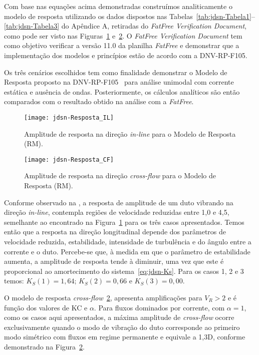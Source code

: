 Com base nas equações acima demonstradas construímos analiticamente o modelo de resposta utilizando os dados dispostos nas Tabelas~\ref{tab:jdsn-Tabela1}--\ref{tab:jdsn-Tabela3} do Apêndice A, retiradas do \textit{FatFree Verification Document}, como pode ser visto nas Figuras~\ref{fig:jdsn-Resposta_IL} e~\ref{fig:jdsn-Resposta_CF}. O \textit{FatFree Verification Document} tem como objetivo verificar a versão 11.0 da planilha \textit{FatFree} e demonstrar que a implementação dos modelos e princípios estão de acordo com a DNV-RP-F105.

Os três cenários escolhidos tem como finalidade demonstrar o Modelo de Resposta proposto na DNV-RP-F105~\cite{DNV2006} para análise unimodal com corrente estática e ausência de ondas. Posteriormente, os cálculos analíticos são então comparados com o resultado obtido na análise com a \textit{FatFree}.


\begin{figure}[H]
\begin{center}
\texttt{[image: jdsn-Resposta\_IL]}
\caption{Amplitude de resposta na direção \textit{in-line} para o Modelo de Resposta (RM).}
\label{fig:jdsn-Resposta_IL}
\end{center}
\end{figure}

\begin{figure}[H]
\begin{center}
\texttt{[image: jdsn-Resposta\_CF]}
\caption{Amplitude de resposta na direção \textit{cross-flow} para o Modelo de Resposta (RM).}
\label{fig:jdsn-Resposta_CF}
\end{center}
\end{figure}

Conforme observado na , a resposta de amplitude de um duto vibrando na direção \textit{in-line}, contempla regiões de velocidade reduzidas entre 1,0 e 4,5, semelhante ao encontrado na Figura~\ref{fig:jdsn-Resposta_IL} para os três casos apresentados. Temos então que a resposta na direção longitudinal depende dos parâmetros de velocidade reduzida, estabilidade, intensidade de turbulência e do ângulo entre a corrente e o duto. Percebe-se que, à medida em que o parâmetro de estabilidade aumenta, a amplitude de resposta tende à diminuir, uma vez que este é proporcional ao amortecimento do sistema~\ref{eq:jdsn-Ks}. Para os casos 1, 2 e 3 temos: $K_S(1) = 1,64$; $K_S(2) = 0,66$ e $K_S(3) = 0,00$.

O modelo de resposta \textit{cross-flow}~\ref{fig:jdsn-Resposta_CF}, apresenta amplificações para $V_R > 2$ e é função dos valores de KC e $\alpha$. Para fluxos dominados por corrente, com $\alpha = 1$, como os casos aqui apresentados, a máxima amplitude de \textit{cross-flow} ocorre exclusivamente quando o modo de vibração do duto corresponde ao primeiro modo simétrico com fluxos em regime permanente e equivale a 1,3D, conforme demonstrado na Figura~\ref{fig:jdsn-Resposta_CF}.

